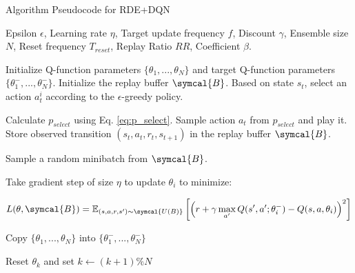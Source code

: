 \documentclass[base]{subfiles}
\begin{document}
\begin{algorithm}
	\caption{Algorithm Pseudocode for RDE+DQN}
	\label{alg:rde_dqn}
	\begin{algorithmic}[1]
		\Require Epsilon $\epsilon$, Learning rate $\eta$, Target update frequency $f$, Discount $\gamma$, Ensemble size $N$, Reset frequency $T_{reset}$, Replay Ratio $RR$, Coefficient $\beta$.


		\State Initialize Q-function parameters $\{ \theta_1, ..., \theta_N \}$ and target Q-function parameters $\{ \theta_1^{-}, ..., \theta_N^{-} \}$.
		\State Initialize the replay buffer $\symcal{B}$.
		\State Based on state $s_t$, select an action $a_t^i$ according to the $\epsilon$-greedy policy.
		\EndFor

		\State Calculate $p_{select}$ using Eq. \ref{eq:p_select}.
		\State Sample action $a_t$ from $p_{select}$ and play it.
		\State Store observed transition $(s_t, a_t, r_t, s_{t+1})$ in the replay buffer $\symcal{B}$.

		\State Sample a random minibatch from $\symcal{B}$.


		\State Take gradient step of size $\eta$ to update $\theta_i$ to minimize:

		\begin{equation}
			\notag
			L(\theta, \symcal{B}) = \mathbb{E}_{(s, a, r, s') \sim \symcal{U(B)}} \left[ \left( r + \gamma \max_{a'} Q(s', a'; \theta_i^{-}) - Q(s, a, \theta_i)  \right)^2 \right]
		\end{equation}

		\EndFor

		\State Copy $\{ \theta_1, ..., \theta_N \}$ into $\{ \theta_1^{-}, ..., \theta_N^{-} \}$
		\EndIf

		\EndFor

		\State Reset $\theta_k$ and set $k \leftarrow (k+1) \% N$
		\EndIf

		\EndFor

		\EndFor
	\end{algorithmic}
\end{algorithm}


\ifSubfilesClassLoaded{%
	\printbibliography
}{}
\end{document}
